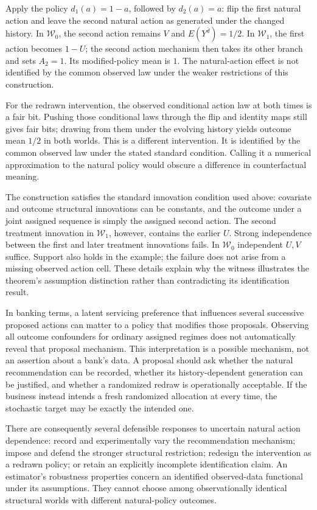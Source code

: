 Apply the policy $d_1(a)=1-a$, followed by $d_2(a)=a$: flip the first natural
action and leave the second natural action as generated under the changed
history. In $\mathcal W_0$, the second action remains $V$ and
$E(Y^{\bar d})=1/2$. In $\mathcal W_1$, the first action becomes $1-U$;
the second action mechanism then takes its other branch and sets $A_2=1$.
Its modified-policy mean is $1$. The natural-action effect is not identified
by the common observed law under the weaker restrictions of this construction.

For the redrawn intervention, the observed conditional action law at both
times is a fair bit. Pushing those conditional laws through the flip and
identity maps still gives fair bits; drawing from them under the evolving
history yields outcome mean $1/2$ in both worlds. This is a different
intervention. It is identified by the common observed law under the stated
standard condition. Calling it a numerical approximation to the natural
policy would obscure a difference in counterfactual meaning.

The construction satisfies the standard innovation condition used above:
covariate and outcome structural innovations can be constants, and the
outcome under a joint assigned sequence is simply the assigned second
action. The second treatment innovation in $\mathcal W_1$, however, contains
the earlier $U$. Strong independence between the first and later treatment
innovations fails. In $\mathcal W_0$ independent $U,V$ suffice. Support also
holds in the example; the failure does not arise from a missing observed
action cell. These details explain why the witness illustrates the theorem's
assumption distinction rather than contradicting its identification result.
\citep{lmtp2023,exec17_s5_math}

In banking terms, a latent servicing preference that influences several
successive proposed actions can matter to a policy that modifies those
proposals. Observing all outcome confounders for ordinary assigned regimes
does not automatically reveal that proposal mechanism. This interpretation
is a possible mechanism, not an assertion about a bank's data. A proposal
should ask whether the natural recommendation can be recorded, whether its
history-dependent generation can be justified, and whether a randomized
redraw is operationally acceptable. If the business instead intends a fresh
randomized allocation at every time, the stochastic target may be exactly
the intended one.

There are consequently several defensible responses to uncertain natural
action dependence: record and experimentally vary the recommendation
mechanism; impose and defend the stronger structural restriction; redesign
the intervention as a redrawn policy; or retain an explicitly incomplete
identification claim. An estimator's robustness properties concern an
identified observed-data functional under its assumptions. They cannot
choose among observationally identical structural worlds with different
natural-policy outcomes.

